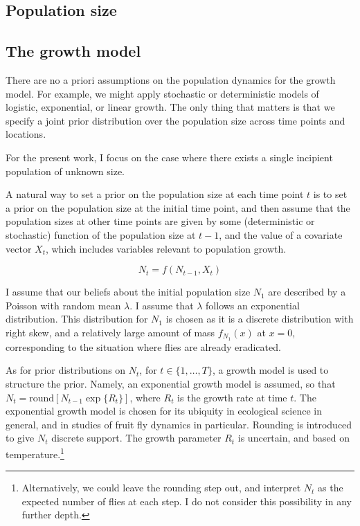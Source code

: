 \documentclass[
]{book}
\begin{document}
\hypertarget{population-size}{%
\subsection{Population size}\label{population-size}}

\hypertarget{the-growth-model-1}{%
\subsection{The growth model}\label{the-growth-model-1}}

There are no a priori assumptions on the population dynamics for the growth model. For example, we might apply stochastic or deterministic models of logistic, exponential, or linear growth. The only thing that matters is that we specify a joint prior distribution over the population size across time points and locations.

For the present work, I focus on the case where there exists a single incipient population of unknown size.

A natural way to set a prior on the population size at each time point \(t\) is to set a prior on the population size at the initial time point, and then assume that the population sizes at other time points are given by some (deterministic or stochastic) function of the population size at \(t-1\), and the value of a covariate vector \(X_t\), which includes variables relevant to population growth.

\[
N_t = f(N_{t-1}, X_t)
\]

I assume that our beliefs about the initial population size \(N_1\) are described by a Poisson with random mean \(\lambda\). I assume that \(\lambda\) follows an exponential distribution. This distribution for \(N_1\) is chosen as it is a discrete distribution with right skew, and a relatively large amount of mass \(f_{N_1}(x)\) at \(x = 0\), corresponding to the situation where flies are already eradicated.

As for prior distributions on \(N_t\), for \(t \in \{1, \ldots, T\}\), a growth model is used to structure the prior. Namely, an exponential growth model is assumed, so that \(N_t = \mathrm{round}[N_{t-1} \exp\{R_t\}]\), where \(R_t\) is the growth rate at time \(t\). The exponential growth model is chosen for its ubiquity in ecological science in general, and in studies of fruit fly dynamics in particular. Rounding is introduced to give \(N_t\) discrete support. The growth parameter \(R_t\) is uncertain, and based on temperature.\footnote{Alternatively, we could leave the rounding step out, and interpret \(N_t\) as the expected number of flies at each step. I do not consider this possibility in any further depth.}
\end{document}

